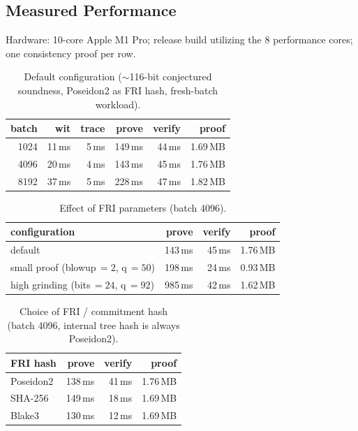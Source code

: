 \documentclass[11pt]{article}
\begin{document}
\subsection{Measured Performance}
\label{sec:measured}

Hardware: 10-core Apple M1 Pro; release build utilizing the 8 performance cores; one consistency proof per row.

\begin{table}[ht]
\centering
\caption{Default configuration ($\sim$116-bit conjectured soundness, Poseidon2 as FRI hash, fresh-batch workload).}
\label{tab:perf-default}
\small
\begin{tabular}{r|rrrr|r}
\toprule
\textbf{batch} & \textbf{wit} & \textbf{trace} & \textbf{prove} & \textbf{verify} & \textbf{proof} \\
\midrule
1024 & 11\,ms & 5\,ms & 149\,ms & 44\,ms & 1.69\,MB \\
4096 & 20\,ms & 4\,ms & 143\,ms & 45\,ms & 1.76\,MB \\
8192 & 37\,ms & 5\,ms & 228\,ms & 47\,ms & 1.82\,MB \\
\bottomrule
\end{tabular}
\end{table}

\begin{table}[htb]
\centering
\caption{Effect of FRI parameters (batch 4096).}
\label{tab:perf-knobs}
\small
\begin{tabular}{l|rrr}
\toprule
\textbf{configuration} & \textbf{prove} & \textbf{verify} & \textbf{proof} \\
\midrule
default & 143\,ms & 45\,ms & 1.76\,MB \\
small proof (blowup\,$=2$, q\,$=50$) & 198\,ms & 24\,ms & 0.93\,MB \\
high grinding (bits\,$=24$, q\,$=92$) & 985\,ms & 42\,ms & 1.62\,MB \\
\bottomrule
\end{tabular}
\end{table}

\begin{table}[ht]
\centering
\caption{Choice of FRI / commitment hash (batch 4096, internal tree hash is always Poseidon2).}
\label{tab:perf-frihash}
\small
\begin{tabular}{l|rrr}
\toprule
\textbf{FRI hash} & \textbf{prove} & \textbf{verify} & \textbf{proof} \\
\midrule
Poseidon2 & 138\,ms & 41\,ms & 1.76\,MB \\
SHA-256   & 149\,ms & 18\,ms & 1.69\,MB \\
Blake3    & 130\,ms & 12\,ms & 1.69\,MB \\
\bottomrule
\end{tabular}
\end{table}
\end{document}
